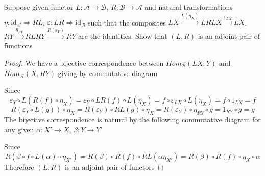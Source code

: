 \documentclass{article}
\newenvironment{exercise}[2][Exercise]{\begin{trivlist}
\item[\hskip \labelsep {\bfseries #1}\hskip \labelsep {\bfseries #2.}]}{\end{trivlist}}
\theoremstyle{definition}
\theoremstyle{remark}
\theoremstyle{definition}
\begin{document}
\begin{exercise}{\textbf{A6.2}}
Suppose given functor $L:\mathcal{A}\to\mathcal{B}$, $R:\mathcal{B}\to\mathcal{A}$ and natural transformations $\eta:\mathrm{id}_{\mathcal A}\Rightarrow RL$, $\varepsilon:LR\Rightarrow\mathrm{id}_{\mathcal B}$ such that the composites $LX\xrightarrow{L(\eta_X)}LRLX\xrightarrow{\varepsilon_{LX}}LX$, $RY\xrightarrow{\eta_{RY}}RLRY\xrightarrow{R(\varepsilon_Y)}RY$ are the identities. Show that $(L,R)$ is an adjoint pair of functions
\end{exercise}

\begin{proof}
We have a bijective correspondence between $Hom_{\mathscr B}(LX,Y)$ and $Hom_{\mathscr A}(X,RY)$ giving by commutative diagram
\begin{center}
\end{center}
Since
\[\varepsilon_Y\circ L(R(f)\circ\eta_X)=\varepsilon_Y\circ LR(f)\circ L(\eta_X)=f\circ\varepsilon_{LX}\circ L(\eta_X)=f\circ1_{LX}=f\]
\[R(\varepsilon_Y\circ L(g))\circ\eta_X=R(\varepsilon_Y)\circ RL(g)\circ\eta_X=R(\varepsilon_Y)\circ\eta_{RY}\circ g=1_{RY}\circ g=g\]
The bijective correspondence is natural by the following commutative diagram for any given $\alpha:X'\to X$, $\beta:Y\to Y'$
\begin{center}
\end{center}
Since
\[R(\beta\circ f\circ L(\alpha)\circ\eta_{X'})=R(\beta)\circ R(f)\circ RL(\alpha\eta_{X'})=R(\beta)\circ R(f)\circ\eta_X\circ\alpha\]
Therefore $(L,R)$ is an adjoint pair of functors
\end{proof}
\end{document}
